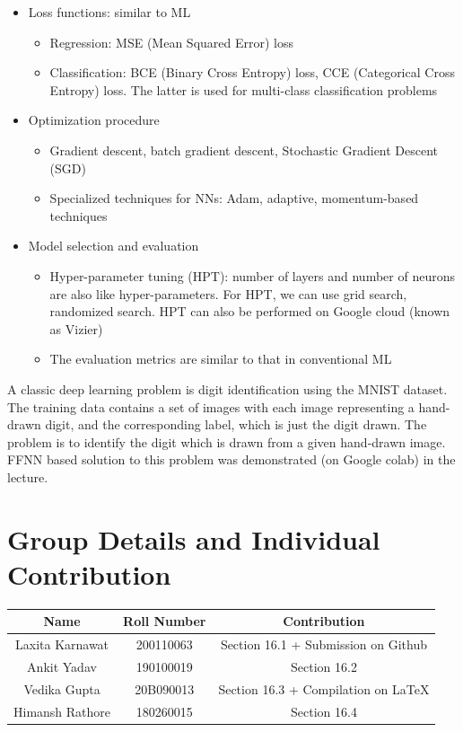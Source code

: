 \documentclass[11pt, twosides]{article}
\begin{document}
\begin{itemize}
    \item Loss functions: similar to ML
    \begin{itemize}
        \item Regression: MSE (Mean Squared Error) loss
        \item Classification: BCE (Binary Cross Entropy) loss, CCE (Categorical Cross Entropy) loss. The latter is used for multi-class classification problems
    \end{itemize}
    
    \item Optimization procedure
    \begin{itemize}
        \item Gradient descent, batch gradient descent, Stochastic Gradient Descent (SGD)
        \item Specialized techniques for NNs: Adam, adaptive, momentum-based techniques
    \end{itemize}
    
    \item Model selection and evaluation
    \begin{itemize}
        \item Hyper-parameter tuning (HPT): number of layers and number of neurons are also like hyper-parameters. For HPT, we can use grid search, randomized search. HPT can also be performed on Google cloud (known as Vizier)
        \item The evaluation metrics are similar to that in conventional ML
    \end{itemize}
\end{itemize}

A classic deep learning problem is digit identification using the MNIST dataset. The training data contains a set of images with each image representing a hand-drawn digit, and the corresponding label, which is just the digit drawn. The problem is to identify the digit which is drawn from a given hand-drawn image. FFNN based solution to this problem was demonstrated (on Google colab) in the lecture.

\section{Group Details and Individual Contribution}
\begin{center}
\begin{tabular}{||c | c | c||} 
 \hline
 Name & Roll Number & Contribution \\ [0.5ex] 
 \hline\hline
 Laxita Karnawat & 200110063 & Section 16.1 + Submission on Github  \\ 
 \hline
 Ankit Yadav & 190100019 & Section 16.2 \\
 \hline
 Vedika Gupta & 20B090013 & Section 16.3 + Compilation on \LaTeX  \\
 \hline
 Himansh Rathore & 180260015 & Section 16.4 \\
 \hline
\end{tabular}
\end{center}
\end{document}

